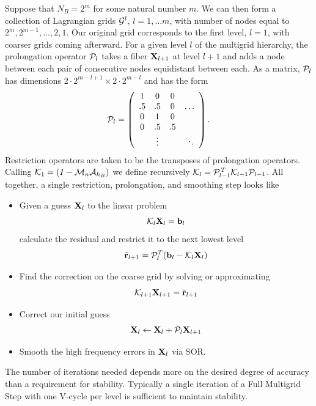 Suppose that $N_B=2^m$ for some natural number $m$. We can then form a collection of Lagrangian grids $\mathcal{G}^l$, $l=1, \ldots m$, with number of nodes equal to $2^m,2^{m-1},  \ldots, 2,1$.
Our original grid corresponds to the first level, $l=1$, with coarser grids coming afterward.
For a given level $l$  of the multigrid hierarchy,  the prolongation operator $\mathcal{P}_l$ takes a fiber $\mathbf{X}_{l+1}$ at level $l+1$ and adds a node between each pair of consecutive nodes equidistant between each. As a matrix,  $\mathcal{P}_l$ has dimensions $2\cdot 2^{m-l+1}\times 2\cdot 2^{m-l}$ and has the form
\begin{equation}
\mathcal{P}_l = 
\left( \begin{array}{cccc}
1  & 0  & 0  &  \\
.5 & .5 & 0  & \dots \\
0  & 1  & 0  & \\
0  & .5 & .5 & \\
   &\vdots& & \ddots
\end{array} \right).
\end{equation}
Restriction operators are taken to be the transposes of prolongation operators. Calling $\mathcal{K}_1 = (\mathit{I}- \mathcal{M}_n\mathcal{A}_{h_B})$ we define recursively $\mathcal{K}_l = \mathcal{P}_{l-1}^{\mathit{T}} \mathcal{K}_{l-1} \mathcal{P}_{l-1}$.
All together,  a single restriction, prolongation, and smoothing step looks like
\begin{itemize}
\item Given a guess $\mathbf{X}_l$ to the linear problem
\begin{equation}
\mathcal{K}_l\mathbf{X}_l = \mathbf{b}_l 
\end{equation}
calculate the residual and restrict it to the next lowest level
\begin{equation}
\tilde{\mathbf{r}}_{l+1} = \mathcal{P}_l^T(\mathbf{b}_l - \mathcal{K}_l\mathbf{X}_l)
\end{equation}
\item Find the correction on the coarse grid by solving or approximating
\begin{equation}
\mathcal{K}_{l+1}\mathbf{X}_{l+1} = \tilde{\mathbf{r}}_{l+1}
\end{equation}
\item Correct our initial guess
\begin{equation}
\mathbf{X}_l \leftarrow \mathbf{X}_l + \mathcal{P}_l \mathbf{X}_{l+1}
\end{equation}
\item Smooth the high frequency errors in $\mathbf{X}_l$ via SOR.
\end{itemize}
The number of iterations needed depends more on the desired degree of accuracy than a requirement for stability. Typically a single iteration of a Full Multigrid Step with one V-cycle per level is sufficient to maintain stability. 



